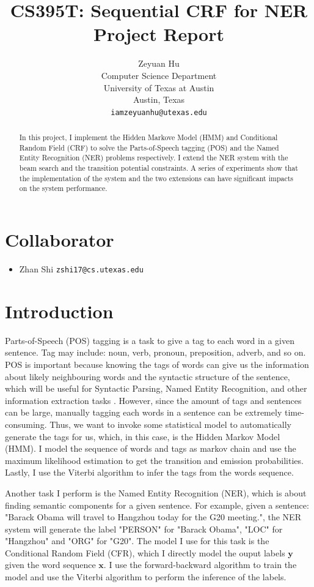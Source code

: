\documentclass[11pt,a4paper]{article}
\title{CS395T: Sequential CRF for NER Project Report}
\author{Zeyuan Hu \\
  Computer Science Department \\
  University of Texas at Austin \\
  Austin, Texas \\
  {\tt iamzeyuanhu@utexas.edu} \\
}
\date{}
\begin{document}
\maketitle

\begin{abstract}
In this project, I implement the Hidden Markove Model (HMM) and Conditional Random Field (CRF)
to solve the Parts-of-Speech tagging (POS) and the Named Entity Recognition (NER) problems
respectively. I extend the NER system with the beam search and the transition potential constraints.
A series of experiments show that the implementation of the system and the two extensions can have
significant impacts on the system performance.
\end{abstract}

\section{Collaborator}

\begin{itemize}
\item Zhan Shi {\tt zshi17@cs.utexas.edu}
\end{itemize}

\section{Introduction}

Parts-of-Speech (POS) tagging is a task to give a tag to each word in a given sentence.
Tag may include: noun, verb, pronoun, preposition, adverb, and so on. 
POS is important because knowing the tags of words can
give us the information about likely neighbouring words 
and the syntactic structure of the sentence,
which will be useful for Syntactic Parsing, Named Entity Recognition, and other 
information extraction tasks \cite[Chapter~10]{Jurafsky:2017}. However, since the amount
of tags and sentences can be large, manually tagging each words in a sentence
can be extremely time-consuming. Thus, we want to invoke some statistical model
to automatically generate the tags for us, which, in this case, is the Hidden Markov Model (HMM). 
I model the sequence of words and tags as markov chain
and use the maximum likelihood estimation to get the transition and emission probabilities.
Lastly, I use the Viterbi algorithm to infer the tags from the words sequence.

Another task I perform is the Named Entity Recognition (NER), which is about 
finding semantic components for a given sentence. For example, given a
sentence: "Barack Obama will travel to Hangzhou today for the G20 meeting.",
the NER system will generate the label "PERSON" for "Barack Obama", "LOC" for "Hangzhou" and "ORG" for "G20". 
The model I use for this task is the Conditional Random Field (CFR),
which I directly model the ouput labels $\boldsymbol{y}$ given the word sequence $\boldsymbol{x}$.
I use the forward-backward algorithm to train the model and use the Viterbi algorithm
to perform the inference of the labels.
\end{document}
